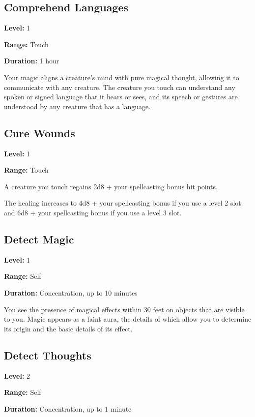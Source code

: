 \documentclass[12pt,letterpaper,twocolumn,openany,nodeprecatedcode,bg=none]{dndbook}
\let\oldsubsection\subsection
\renewcommand{\subsection}[1]{%
  \needspace{5\baselineskip}%
  \oldsubsection{#1}%
}
\begin{document}
\subsection{Comprehend Languages}\label{comprehend-languages}

\textbf{Level:} 1

\textbf{Range:} Touch

\textbf{Duration:} 1 hour

Your magic aligns a creature's mind with pure magical thought, allowing
it to communicate with any creature. The creature you touch can
understand any spoken or signed language that it hears or sees, and its
speech or gestures are understood by any creature that has a language.

\subsection{Cure Wounds}\label{cure-wounds}

\textbf{Level:} 1

\textbf{Range:} Touch

A creature you touch regains 2d8 + your spellcasting bonus hit points.

The healing increases to 4d8 + your spellcasting bonus if you use a
level 2 slot and 6d8 + your spellcasting bonus if you use a level 3
slot.

\newpage

\subsection{Detect Magic}\label{detect-magic}

\textbf{Level:} 1

\textbf{Range:} Self

\textbf{Duration:} Concentration, up to 10 minutes

You see the presence of magical effects within 30 feet on objects that
are visible to you. Magic appears as a faint aura, the details of which
allow you to determine its origin and the basic details of its effect.

\subsection{Detect Thoughts}\label{detect-thoughts}

\textbf{Level:} 2

\textbf{Range:} Self

\textbf{Duration:} Concentration, up to 1 minute
\end{document}
